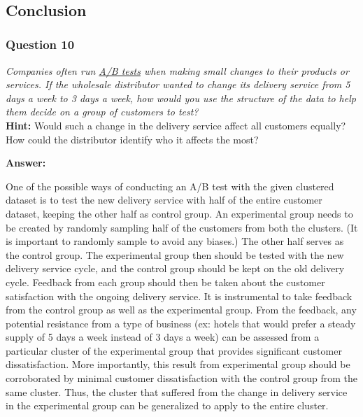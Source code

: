 \documentclass{article}
\begin{document}
    \begin{center}
    \end{center}
    { \hspace*{\fill} \\}
    
    \subsection{Conclusion}\label{conclusion}

    \subsubsection{Question 10}\label{question-10}

\emph{Companies often run
\href{https://en.wikipedia.org/wiki/A/B_testing}{A/B tests} when making
small changes to their products or services. If the wholesale
distributor wanted to change its delivery service from 5 days a week to
3 days a week, how would you use the structure of the data to help them
decide on a group of customers to test?}\\
\textbf{Hint:} Would such a change in the delivery service affect all
customers equally? How could the distributor identify who it affects the
most?

    \textbf{Answer:}

One of the possible ways of conducting an A/B test with the given
clustered dataset is to test the new delivery service with half of the
entire customer dataset, keeping the other half as control group. An
experimental group needs to be created by randomly sampling half of the
customers from both the clusters. (It is important to randomly sample to
avoid any biases.) The other half serves as the control group. The
experimental group then should be tested with the new delivery service
cycle, and the control group should be kept on the old delivery cycle.
Feedback from each group should then be taken about the customer
satisfaction with the ongoing delivery service. It is instrumental to
take feedback from the control group as well as the experimental group.
From the feedback, any potential resistance from a type of business (ex:
hotels that would prefer a steady supply of 5 days a week instead of 3
days a week) can be assessed from a particular cluster of the
experimental group that provides significant customer dissatisfaction.
More importantly, this result from experimental group should be
corroborated by minimal customer dissatisfaction with the control group
from the same cluster. Thus, the cluster that suffered from the change
in delivery service in the experimental group can be generalized to
apply to the entire cluster.
\end{document}
